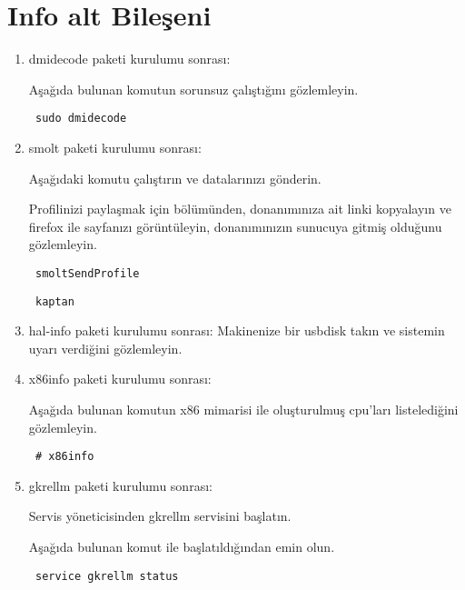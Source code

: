 \documentclass[a4paper,10pt]{article}
\begin{document}
\section{Info alt Bileşeni}
\begin{enumerate}

\item dmidecode paketi kurulumu sonrası:

Aşağıda bulunan komutun sorunsuz çalıştığını gözlemleyin.
\begin{verbatim}
 sudo dmidecode
\end{verbatim}

 \item smolt paketi kurulumu sonrası:

Aşağıdaki komutu çalıştırın ve datalarınızı gönderin.

Profilinizi paylaşmak için bölümünden, donanımınıza ait linki kopyalayın ve firefox ile sayfanızı görüntüleyin, donanımınızın sunucuya gitmiş olduğunu gözlemleyin.

\begin{verbatim}
 smoltSendProfile
\end{verbatim}

\begin{verbatim}
 kaptan
\end{verbatim}

 \item  hal-info paketi kurulumu sonrası:
Makinenize bir usbdisk takın ve sistemin uyarı verdiğini gözlemleyin.

 \item  x86info paketi kurulumu sonrası:

Aşağıda bulunan komutun x86 mimarisi ile oluşturulmuş cpu'ları listelediğini gözlemleyin.
\begin{verbatim}
 # x86info
\end{verbatim}


 \item gkrellm paketi kurulumu sonrası:

Servis yöneticisinden gkrellm servisini başlatın.

Aşağıda bulunan komut ile başlatıldığından emin olun.
\begin{verbatim}
 service gkrellm status
\end{verbatim}

\end{enumerate}
\end{document}
